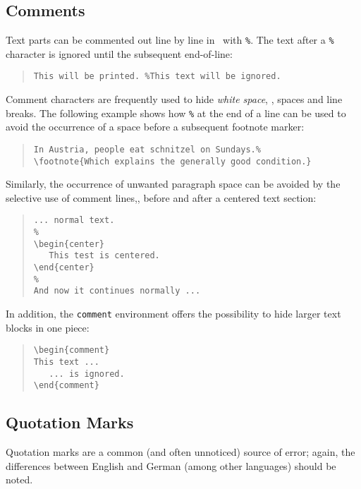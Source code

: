 \subsection{Comments}
\label{sec:comments}

Text parts can be commented out line by line in \latex\ with \verb!%!. The text
after a \verb!%! character is ignored until the subsequent end-of-line:
%
\begin{quote}
    \verb!This will be printed. %This text will be ignored.!
\end{quote}
%
Comment characters are frequently used to hide \emph{white space}, \ie, spaces
and line breaks. The following example shows how \verb!%! at the end of a line
can be used to avoid the occurrence of a space before a subsequent footnote
marker:
%
\begin{quote}
\begin{verbatim}
In Austria, people eat schnitzel on Sundays.%
\footnote{Which explains the generally good condition.}
\end{verbatim}
\end{quote}
%
Similarly, the occurrence of unwanted paragraph space can be avoided by the
selective use of comment lines,\eg, before and after a centered text section:
%
\begin{quote}
\begin{verbatim}
... normal text.
%
\begin{center}
   This test is centered.
\end{center}
%
And now it continues normally ...
\end{verbatim}
\end{quote}
%
In addition, the \verb!comment! environment offers the possibility to hide
larger text blocks in one piece:
%
\begin{quote}
\begin{verbatim}
\begin{comment}
This text ...
   ... is ignored.
\end{comment}
\end{verbatim}
\end{quote}

\subsection{Quotation Marks}
\label{sec:quotation-marks}

Quotation marks are a common (and often unnoticed) source of error; again, the
differences between English and German (among other languages) should be noted.

